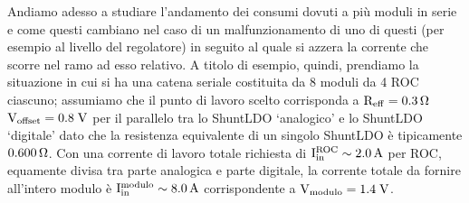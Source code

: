Andiamo adesso a studiare l'andamento dei consumi dovuti a più moduli in serie e come questi cambiano nel caso di un malfunzionamento di uno di questi (per esempio al livello del regolatore) in seguito al quale si azzera la corrente che scorre nel ramo ad esso relativo.
A titolo di esempio, quindi, prendiamo la situazione in cui si ha una catena seriale costituita da 8 moduli da 4 ROC ciascuno; 
assumiamo che il punto di lavoro scelto corrisponda a $\mathrm{R_{eff}=0.3{\rm \, \Omega}}$ $\mathrm{V_{offset}=0.8}\rm \; V$ per il parallelo tra lo ShuntLDO `analogico' e lo ShuntLDO `digitale' dato che la resistenza equivalente di un singolo ShuntLDO \`e tipicamente $0.600{\rm \, \Omega}$.
Con una corrente di lavoro totale richiesta di $\mathrm{I^{ROC}_{in}\sim2.0}\rm \, A$ per ROC, equamente divisa tra parte analogica e parte digitale, la corrente totale da fornire all'intero modulo \`e $\mathrm{I_{in}^{modulo}\sim8.0}\rm \, A$ corrispondente a $\mathrm{V_{modulo}=1.4} \rm \; V$.

